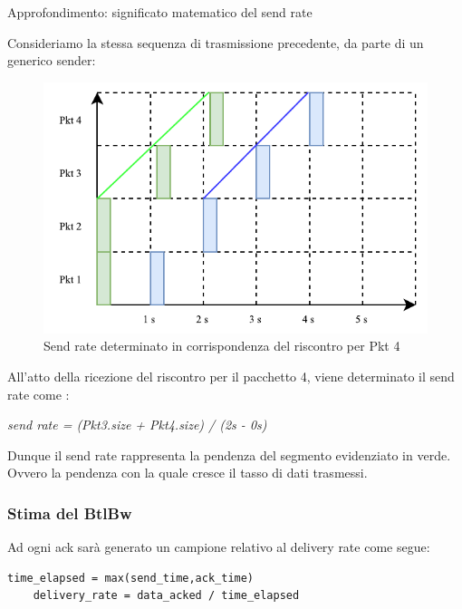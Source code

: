 \begin{approfondimento}{Approfondimento: significato matematico del send rate}

Consideriamo la stessa sequenza di trasmissione precedente, da parte di un generico sender:

\begin{figure}[H]

\center
\caption{Send rate determinato in corrispondenza del riscontro per Pkt 4}
\includegraphics[scale=1.1]{chapters/bbr/img/send_rate}

\end{figure}

All'atto della ricezione del riscontro per il pacchetto 4, viene determinato il send rate come : \bigskip

\begin{center}

\textit{send rate = (Pkt3.size + Pkt4.size) / (2s - 0s)}

\end{center}

Dunque il send rate rappresenta la pendenza del segmento evidenziato in verde. Ovvero la pendenza con la quale cresce il tasso di dati trasmessi. \bigskip 

\end{approfondimento}

\subsubsection{Stima del BtlBw}

Ad ogni ack sarà generato un campione relativo al delivery rate come segue:

\begin{lstlisting}[caption=Delivery rate evaluation]
	time_elapsed = max(send_time,ack_time)
	delivery_rate = data_acked / time_elapsed
\end{lstlisting}

